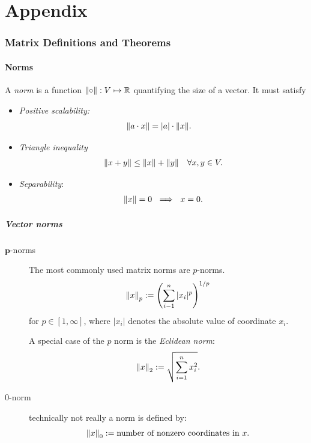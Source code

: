\newpage
\appendix
 
\part*{Appendix}
\section{Matrix Definitions and Theorems}
\subsection{Norms}
A \emph{norm} is a function $\left\lVert\circ\right\rVert: V \mapsto \mathbb{R}$ quantifying the size of a vector. It must satisfy
\begin{itemize}
    \item \emph{Positive scalability:}
    \begin{align*}
        \norm{a\cdot x} &= |a|\cdot \norm{x}.
    \end{align*}
    \item \emph{Triangle inequality}
    \begin{align*}
        \norm{x+y} \leq \norm{x} + \norm{y} \quad \forall x,y \in V.
    \end{align*}
    \item \emph{Separability}:
    \begin{align*}
        \left\lVert x\right\rVert = 0 \ \implies \ x=0.
    \end{align*}
\end{itemize}
\subsubsection{Vector norms}
\begin{description}
    \item[$\mathbf{p}$-norms] The most commonly used matrix norms are $p$-norms.
        \begin{align*}
            \left\lVert x\right\rVert_p := \left(\sum_{i-1}^n |x_i|^p\right)^{1/p}
        \end{align*}
        for $p \in [1,\infty]$, where $|x_i|$ denotes the absolute value of coordinate $x_i$.
        
        A special case of the $p$ norm is the \emph{Eclidean norm}:
        \begin{align*}
            \left\lVert x\right\rVert_2:= \sqrt{\sum_{i=1}^n x_i^2}.
        \end{align*}
    \item[$0$-norm] technically not really a norm is defined by:
        \begin{align*}
            \left\lVert x\right\rVert_0 := \text{number of nonzero coordinates in $x$}.
        \end{align*}
\end{description}
